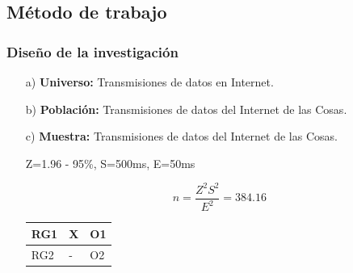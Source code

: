     \subsection{Método de trabajo}    
            \subsubsection{Diseño de la investigación}
                \begin{enumerate}   
                    \item[a)]{\bf Universo:} Transmisiones de datos en Internet.\par
                    \item[b)]{\bf Población:} Transmisiones de datos del Internet de las Cosas.\par
                    \item[c)]{\bf Muestra:} Transmisiones de datos del Internet de las Cosas.\par
                        Z=1.96 - 95\%, S=500ms, E=50ms\par
                        \begin{equation*}\label{}
                            n = \frac{Z^{2}S^{2}}{E^{2}} = 384.16
                        \end{equation*}
                        \begin{table}[h!]
                            \centering
                            \begin{tabular}{|p{1cm}|p{1cm}|p{1cm}|} \hline
            
                            RG1 &
                            X &
                            O1 
            
                            \\ \hline

                            RG2 &
                            - &
                            O2 
            

\end{tabular}
\end{table}
\end{enumerate}
